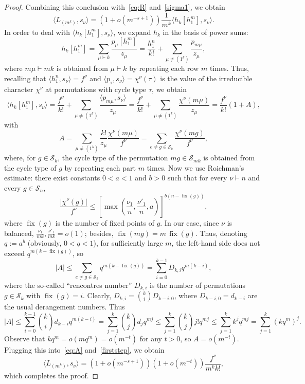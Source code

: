 \documentclass[12pt]%
{amsart}
\renewcommand\S{{\mathcal S}}
\theoremstyle{plain}
\theoremstyle{definition}
\theoremstyle{remark}
\newcommand{\fix}{{\operatorname{fix}}}
\begin{document}
\begin{proof}
Combining this conclusion with~\eqref{eq:R} and~\eqref{sigma1}, we obtain
\begin{equation}\label{firststep}
    \langle L_{(m^k)},s_\nu\rangle
    = \left(1+o(m^{-s+1})\right)\frac1{m^k}\langle h_k[h_1^m],s_\nu\rangle.
\end{equation}    
In order to deal with $\langle h_k[h_1^m],s_\nu\rangle$, we
expand $h_k$ in the basis of power sums:        
\[
    h_k[h_1^m]
    = \sum_{\mu\vdash k} \frac{p_\mu[h_1^m]}{z_\mu}
    = \frac{h_1^n}{k!} 
    + \sum_{\mu \ne (1^k)} \frac{p_{m\mu}}{z_\mu},
\]
where $m \mu \vdash mk$ is obtained from $\mu \vdash k$ by repeating each row $m$ times. 
Thus,  recalling that $\langle h_1^n,s_\nu \rangle = f^\nu$
and $\langle p_\tau,s_\nu\rangle = \chi^\nu(\tau)$ is the value of the irreducible character $\chi^\nu$ at permutations with cycle type $\tau$, we obtain
\begin{equation}\label{eq:A}
    \langle h_k[h_1^m],s_\nu \rangle
    = \frac{f^\nu}{k!} 
    + \sum_{\mu \ne (1^k)} \frac{\langle p_{m\mu},s_\nu \rangle}{z_\mu}
    = \frac{f^\nu}{k!}
    + \sum_{\mu \ne (1^k)}
    \frac{\chi^\nu(m\mu)}{z_\mu}
    = \frac{f^\nu}{k!}(1+A),
\end{equation}
with
\[
    A
    = \sum_{\mu \ne (1^k)}
    \frac{k!}{z_\mu}
    \frac{\chi^\nu(m\mu)}{f^\nu}=\sum_{e\ne g\in\S_k}\frac{\chi^\nu(mg)}{f^\nu},
\]
where, for $g \in \S_k$, the cycle type of the permutation $mg\in\S_{mk}$ is obtained from the cycle type of $g$ by repeating each part $m$ times. Now we use Roichman's~\cite{R96} estimate: there exist constants $0 < a < 1$ and $b > 0$ such that for every $\nu\vdash n$ and every $g\in\S_n$,
\[
    \frac{|\chi^\nu(g)|}{f^\nu}
    \le \left[ \max \left( \frac{\nu_1}{n}, \frac{\nu'_1}{n}, a \right) \right]^{b(n-\fix(g))},
\]
where $\fix(g)$ is the number of fixed points of $g$. In our case, since $\nu$ is balanced, $\frac{\nu_1}{mk},\frac{\nu'_1}{mk} = o(1)$; besides, $\fix(mg)=m\,\fix(g)$. Thus, denoting $q:=a^b$ (obviously, $0<q<1$), for sufficiently large $m$, the left-hand side does not exceed
$q^{m(k-\fix(g))}$, so 
\[
    |A|
    \le \sum_{e \ne g \in \S_k} q^{m(k-\fix(g))}
    = \sum_{i=0}^{k-1} D_{k,i} q^{m(k-i)},
\]
where the so-called ``rencontres number'' $D_{k,i}$ is the number of permutations $g\in\S_k$ with $\fix(g)=i$.
Clearly, $D_{k,i} = \binom{k}{i} D_{k-i,0}$, where $D_{k-i,0} = d_{k-i}$ are the usual derangement numbers. Thus
\[
    |A| 
    \le \sum_{i=0}^{k-1} \binom{k}{i} d_{k-i} q^{m(k-i)}
    = \sum_{j=1}^{k} \binom{k}{j} d_{j} q^{mj}
    \le \sum_{j=1}^{k} \binom{k}{j} j! q^{mj}
    \le \sum_{j=1}^{k} k^j q^{mj}
    =\sum_{j=1}^{k} (kq^m)^j.
\]
Observe that $kq^m=o(mq^m)=o(m^{-t})$ for any $t>0$, so $A = o(m^{-t})$. Plugging this into~\eqref{eq:A} and~\eqref{firststep}, we obtain
$$
\langle L_{(m^k)},s_\nu\rangle=\left(1+o(m^{-s+1})\right)\left(1+o(m^{-t})\right)
\frac{f^\nu}{m^kk!},
$$
which completes the proof.
\end{proof}
\end{document}
